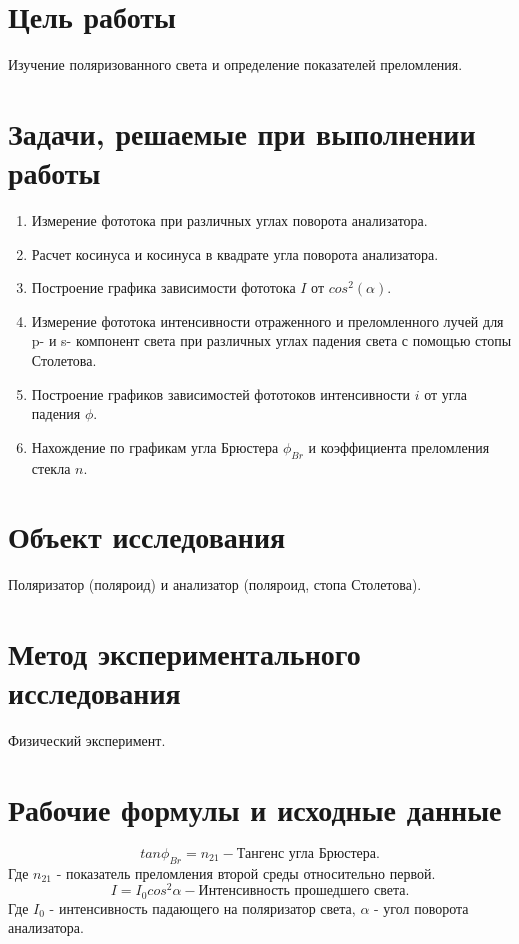 \documentclass{article}
\begin{document}
\section{Цель работы}
\begin{enumerate}
     Изучение поляризованного света и определение показателей преломления.
\end{enumerate}

\section{Задачи, решаемые при выполнении работы}
\begin{enumerate}
    \item Измерение фототока при различных углах поворота анализатора.
    \item Расчет косинуса и косинуса в квадрате угла поворота анализатора.
    \item Построение графика зависимости фототока $I$ от $cos^2(\alpha)$.
    \item Измерение фототока интенсивности отраженного и преломленного лучей для p- и s- компонент света при различных углах падения света с помощью стопы Столетова.
    \item Построение графиков зависимостей фототоков интенсивности $i$ от угла падения $\phi$.
    \item Нахождение по графикам угла Брюстера $\phi_{Br}$ и коэффициента преломления стекла $n$.
\end{enumerate}

\section{Объект исследования}
Поляризатор (поляроид) и анализатор (поляроид, стопа Столетова).
\section{Метод экспериментального исследования}
Физический эксперимент.
\section{Рабочие формулы и исходные данные}
\begin{equation}
 tan\phi_{Br}=n_{21} - \textit{Тангенс угла Брюстера.}
 \label{eq:ref1}
\end{equation}
Где $n_{21}$ - показатель преломления второй среды относительно первой.
\begin{equation}
 I=I_{0}cos^2\alpha - \textit{Интенсивность прошедшего света.}
 \label{eq:ref2}
\end{equation}
Где $I_{0}$ - интенсивность падающего на поляризатор света, $\alpha$ - угол поворота анализатора.
\newpage
\end{document}

